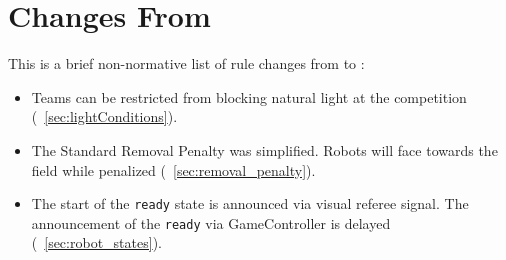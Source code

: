 \section{Changes From \LastRCYear}

This is a brief non-normative list of rule changes from \LastRCYear to \RCYear:
\begin{itemize}
  \item Teams can be restricted from blocking natural light at the competition (\cf~\cref{sec:lightConditions}).
  \item The Standard Removal Penalty was simplified. Robots will face towards the field while penalized (\cf~\cref{sec:removal_penalty}).
  \item The start of the \texttt{ready} state is announced via visual referee signal. The announcement of the \texttt{ready} via GameController is delayed (\cf~\cref{sec:robot_states}).
\end{itemize}
